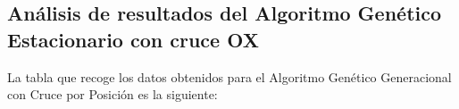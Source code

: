\documentclass[11pt,a4paper]{article}
\begin{document}
	
	
	
	\subsection{Análisis de resultados del Algoritmo Genético Estacionario con cruce OX}
	
	\noindent La tabla que recoge los datos obtenidos para el Algoritmo Genético Generacional con Cruce por Posición es la siguiente:\\
	
\end{document}
